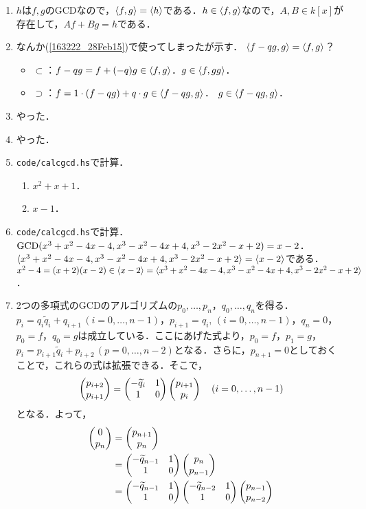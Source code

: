 \documentclass[9pt]{ltjsarticle}
\theoremstyle{break}
\theoremstyle{break}
\theoremstyle{break}
\theoremstyle{break}
\theoremstyle{break}
\theoremstyle{break}
\theoremstyle{break}
\theoremstyle{break}
\theoremstyle{break}
\theoremstyle{break}
\theoremstyle{break}
\theoremstyle{break}
\theoremstyle{break}
\theoremstyle{break}
\theoremstyle{break}
\theoremstyle{nonumberbreak}
\theoremstyle{nonumberbreak}
\begin{document}
\begin{enumerate}[label=(問題\arabic*)]
 \item $h$は$f,g$のGCDなので，$\langle f,g \rangle=\langle h \rangle$である．$h\in \langle f,g \rangle$なので，$A,B\in k[x]$が存在して，$Af+Bg = h$である．
 \item なんか(\ref{163222_28Feb15})で使ってしまったが示す．
$\langle f-qg,g \rangle=\langle f,g \rangle$？
\begin{itemize}
 \item $\subset$：$f-qg = f + (-q)g \in \langle f,g \rangle$．$g \in \langle f,gg \rangle$．
 \item $\supset$：$f = 1\cdot (f-qg) + q\cdot g \in \langle f-qg,g \rangle$．
$g \in \langle f-qg,g \rangle$．
\end{itemize}
 \item やった．
 \item やった．
 \item {\tt code/calcgcd.hs}で計算．
\begin{enumerate}[label=(\alph*)]
 \item $x^2 + x + 1$．
 \item $x-1$．
\end{enumerate}
 \item {\tt code/calcgcd.hs}で計算．
       ${\rm GCD}(x^3+x^2-4x-4,x^3-x^2-4x+4,x^3-2x^2-x+2)=x-2$．
$\langle x^3+x^2-4x-4,x^3-x^2-4x+4,x^3-2x^2-x+2 \rangle=\langle x-2 \rangle$である．$x^2-4 = (x+2)(x-2)\in \langle x-2 \rangle= \langle x^3+x^2-4x-4,x^3-x^2-4x+4,x^3-2x^2-x+2 \rangle$．
 \item 2つの多項式のGCDのアルゴリズムの$p_0,\dots,p_n$，$q_0,\dots,q_n$を得る．
$p_i = q_i \tilde q_i + q_{i+1}\,(i=0,\dots,n-1)$，$p_{i+1}=q_i,\,(i=0,\dots,n-1)$，$q_n=0$，$p_0 = f$，$q_0=g$は成立している．ここにあげた式より，$p_0=f$，$p_1 = g$，$p_i = p_{i+1}\tilde q_i + p_{i+2}\,(p=0,\dots,n-2)$となる．さらに，$p_{n+1}=0$としておくことで，これらの式は拡張できる．そこで，
\begin{align}
\left(\begin{matrix} p_{i+2} \\ p_{i+1} \end{matrix}\right) =
\begin{pmatrix}
 -\widetilde q_i & 1\\
 1 & 0
\end{pmatrix}
\left(\begin{matrix} p_{i+1} \\ p_i \end{matrix}\right) \quad (i=0,\dots,n-1)
\end{align}
となる．よって，
\begin{align}
 \tatev{0 \\ p_n} &= \tatev{p_{n+1} \\ p_n}\\
 &=
\gcdm{-\tilde q_{n-1}}\tatev{p_n \\ p_{n-1}}\\
&=
\gcdm{-\tilde q_{n-1}}\gcdm{-\tilde q_{n-2}}\tatev{p_{n-1} \\ p_{n-2}}\\

\end{align}
\end{enumerate}
\end{document}
